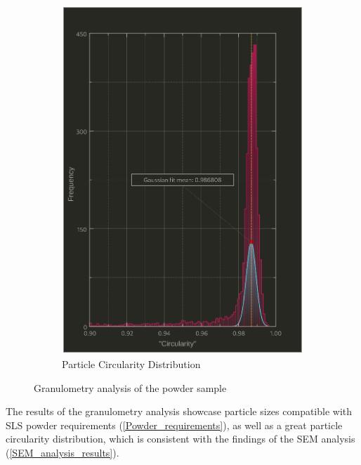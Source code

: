 \documentclass{article}
\begin{document}
\begin{figure}[h!]
\begin{subfigure}[b]{0.5\textwidth}
            \includegraphics[width=\textwidth]{Pictures/Granulometry_plots/Histogram_Circularity.eps}
            \caption{Particle Circularity Distribution}
            \label{fig:circularity_distribution}
        \end{subfigure}
        \caption{Granulometry analysis of the powder sample}
        \label{fig:granulometry_analysis}
    \end{figure}

    \clearpage

    The results of the granulometry analysis showcase particle sizes compatible with SLS powder requirements (\ref{Powder_requirements}), 
    as well as a great particle circularity distribution, which is consistent with the findings of the 
    SEM analysis (\ref{SEM_analysis_results}). \\
\end{document}
